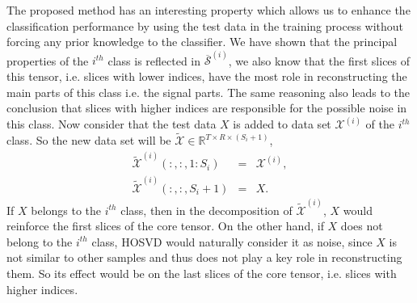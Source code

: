 \documentclass[preprint,12pt]{elsarticle}
\begin{document}
	The proposed method has an interesting property which allows us to enhance the classification performance by using the test data in the training process without forcing any prior knowledge to the classifier. 
	We have shown that the principal properties of the $i^{th}$ class is reflected in $\overline{\mathcal{S}}^{(i)}$, we also know that the first slices of this tensor, i.e. slices with lower indices, have the most role in reconstructing the main parts of this class i.e. the signal parts. The same reasoning also leads to the conclusion that slices with higher indices are responsible for the possible noise in this class. 
	Now consider that the test data $X$ is added to data set $\mathcal{X}^{(i)}$ of the $i^{th}$ class. So the new data set will be
	$\mathcal{\widetilde{X}}\in \mathbb{R}^{T\times R \times (S_{i}+1)}$,
	\begin{eqnarray*}
		\widetilde{\mathcal{X}}^{(i)}(:,:,1:S_i)&=&{\mathcal{X}}^{(i)},\\
		\widetilde{\mathcal{X}}^{(i)}(:,:,S_i+1)&=&X.
	\end{eqnarray*}
	If $X$ belongs to the $i^{th}$ class, then in the decomposition of $\widetilde{\mathcal{X}}^{(i)}$, $X$ would reinforce the first slices of the core tensor. On the other hand, if $X$ does not belong to the $i^{th}$ class, HOSVD would naturally consider it as noise, since $X$ is not similar to other samples and thus does not play a key role in reconstructing them. So its effect would be on the last slices of the core tensor, i.e. slices with higher indices.
	
\end{document}
